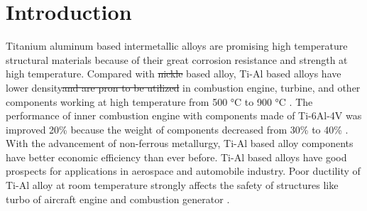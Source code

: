 \documentclass[materials,article,submit,moreauthors,pdftex,10pt,a4paper]{Definitions/mdpi}
\providecommand{\DIFadd}[1]{{\protect\color{blue}\uwave{#1}}} %
\providecommand{\DIFdel}[1]{{\protect\color{red}\sout{#1}}}                      %
\providecommand{\DIFaddbegin}{} %
\providecommand{\DIFaddend}{} %
\providecommand{\DIFdelbegin}{} %
\providecommand{\DIFdelend}{} %
\begin{document}
\section{Introduction}
Titanium  aluminum based intermetallic alloys are promising high temperature structural materials because of their great corrosion resistance and strength at high temperature. Compared with \DIFdelbegin \DIFdel{nickle }\DIFdelend \DIFaddbegin \DIFadd{nickel }\DIFaddend based alloy,  Ti-Al based alloys have lower density\DIFdelbegin \DIFdel{and are pron to be utilized }\DIFdelend \DIFaddbegin \DIFadd{, it can be used }\DIFaddend in combustion engine, turbine, and other components working at high temperature from 500 \si{\degreeCelsius} to 900 \si{\degreeCelsius} \cite{Clemens2016}. The performance of inner combustion engine with components made of Ti-6Al-4V was improved  20\% because the weight of components decreased from 30\% to 40\% \cite{Bewlay2016}. With the advancement of non-ferrous metallurgy, Ti-Al based alloy components have better economic efficiency than ever before. Ti-Al based alloys have good prospects for applications in aerospace and automobile industry. 
Poor ductility of Ti-Al alloy  at room temperature strongly affects the safety of structures like turbo of aircraft engine and combustion generator \cite{Munz2017}. 
\end{document}
